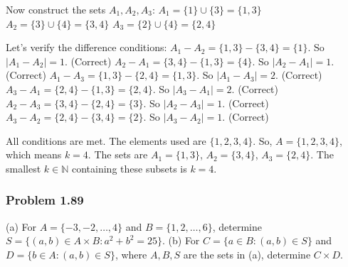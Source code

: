 \documentclass{article}
\begin{document}
\begin{itemize}
\begin{itemize}
\begin{itemize}
Now construct the sets $A_1, A_2, A_3$:
$A_1 = \{1\} \cup \{3\} = \{1, 3\}$
$A_2 = \{3\} \cup \{4\} = \{3, 4\}$
$A_3 = \{2\} \cup \{4\} = \{2, 4\}$

Let's verify the difference conditions:
$A_1 - A_2 = \{1, 3\} - \{3, 4\} = \{1\}$. So $|A_1 - A_2| = 1$. (Correct)
$A_2 - A_1 = \{3, 4\} - \{1, 3\} = \{4\}$. So $|A_2 - A_1| = 1$. (Correct)
$A_1 - A_3 = \{1, 3\} - \{2, 4\} = \{1, 3\}$. So $|A_1 - A_3| = 2$. (Correct)
$A_3 - A_1 = \{2, 4\} - \{1, 3\} = \{2, 4\}$. So $|A_3 - A_1| = 2$. (Correct)
$A_2 - A_3 = \{3, 4\} - \{2, 4\} = \{3\}$. So $|A_2 - A_3| = 1$. (Correct)
$A_3 - A_2 = \{2, 4\} - \{3, 4\} = \{2\}$. So $|A_3 - A_2| = 1$. (Correct)

All conditions are met. The elements used are $\{1, 2, 3, 4\}$.
So, $A = \{1, 2, 3, 4\}$, which means $k=4$.
The sets are $A_1 = \{1, 3\}$, $A_2 = \{3, 4\}$, $A_3 = \{2, 4\}$.
The smallest $k \in \mathbb{N}$ containing these subsets is $k=4$.

\subsubsection*{Problem 1.89}
(a) For $A = \{-3, -2, \dots, 4\}$ and $B = \{1, 2, \dots, 6\}$, determine $S = \{(a, b) \in A \times B : a^2 + b^2 = 25\}$.
(b) For $C = \{a \in B : (a, b) \in S\}$ and $D = \{b \in A : (a, b) \in S\}$, where $A, B, S$ are the sets in (a), determine $C \times D$.


\end{itemize}
\end{itemize}
\end{itemize}
\end{document}
